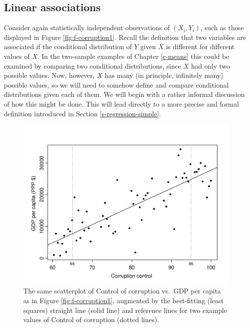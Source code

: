 \documentclass[11pt,a4paper,openany]{book}
\begin{document}
\subsection{Linear associations}\label{ss-regression-descr-assoc}

Consider again statistically independent observations of
\((X_{i}, Y_{i})\), such as those displayed in Figure
\ref{fig:f-corruption1}. Recall the definition that two variables are
associated if the conditional distribution of \(Y\) given \(X\) is
different for different values of \(X\). In the two-sample examples of
Chapter \ref{c-means} this could be examined by comparing two
conditional distributions, since \(X\) had only two possible values.
Now, however, \(X\) has many (in principle, infinitely many) possible
values, so we will need to somehow define and compare conditional
distributions given each of them. We will begin with a rather informal
discussion of how this might be done. This will lead directly to a more
precise and formal definition introduced in Section
\ref{s-regression-simple}.

\begin{figure}[htbp]
\centering
\includegraphics[width=13.50000cm]{corruption2.pdf}
\caption{\label{fig:f-corruption2} The same scatterplot of Control of
corruption vs.~GDP per capita as in Figure \ref{fig:f-corruption1},
augmented by the best-fitting (least squares) straight line (solid line)
and reference lines for two example values of Control of corruption
(dotted lines).}
\end{figure}
\end{document}
